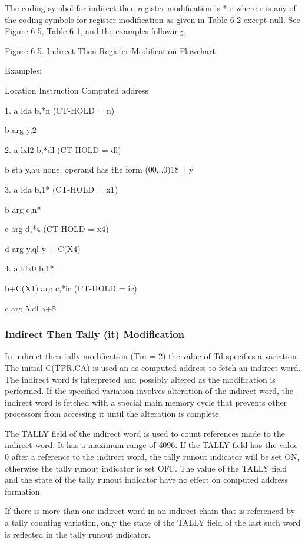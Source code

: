 The coding symbol for indirect then register modification is * r where r is any
of the coding symbols for register modification as given in Table 6-2 except
null. See Figure 6-5, Table 6-1, and the examples following.

Figure 6-5. Indirect Then Register Modification Flowchart

Examples:

Location Instruction Computed address

1. a lda b,*n (CT-HOLD = n)

b arg y,2

2. a lxl2 b,*dl (CT-HOLD = dl)

b sta y,au none; operand has the form (00...0)18 || y

3. a lda b,1* (CT-HOLD = x1)

b arg c,n*

c arg d,*4 (CT-HOLD = x4)

d arg y,ql y + C(X4)

4. a ldx0 b,1*

b+C(X1) arg c,*ic (CT-HOLD = ic)

c arg 5,dl a+5

\subsubsection{Indirect Then Tally (it) Modification}

In indirect then tally modification (Tm = 2) the value of Td specifies a
variation. The initial C(TPR.CA) is used an as computed address to fetch an
indirect word. The indirect word is interpreted and possibly altered as the
modification is performed. If the specified variation involves alteration of
the indirect word, the indirect word is fetched with a special main memory
cycle that prevents other processors from accessing it until the alteration is
complete.


The TALLY field of the indirect word is used to count references made to the
indirect word.  It has a maximum range of 4096. If the TALLY field has the
value 0 after a reference to the indirect word, the tally runout indicator will
be set ON, otherwise the tally runout indicator is set OFF. The value of the
TALLY field and the state of the tally runout indicator have no effect on
computed address formation.


If there is more than one indirect word in an indirect chain that is referenced
by a tally counting variation, only the state of the TALLY field of the last
such word is reflected in the tally runout indicator.


